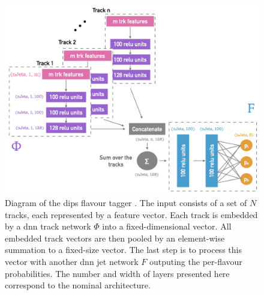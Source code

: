 \begin{figure}[h!]
  \center
  \includegraphics[scale=0.6]{Images/FTAG/dips_structure.png}
  \caption{Diagram of the \gls{dips} flavour tagger \cite{ATL-PHYS-PUB-2020-014}. The input consists of a set of $N$ tracks, each represented by a feature vector. Each track is embedded by a \gls{dnn} track network $\Phi$ into a fixed-dimensional vector. All embedded track vectors are then pooled by an element-wise summation to a fixed-size vector. The last step is to process this vector with another \gls{dnn} jet network $F$ outputing the per-flavour probabilities. The number and width of layers presented here correspond to the nominal architecture.} 
  \label{fig:dipsModel}
\end{figure}

